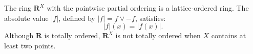 The ring $\mathbf{R}^X$ with the pointwise partial ordering is a lattice-ordered ring. The absolute value $|f|$, defined by $|f| = f \vee -f$, satisfies:
$$|f|(x) = |f(x)|.$$
Although $\mathbf{R}$ is totally ordered, $\mathbf{R}^X$ is not totally ordered when $X$ contains at least two points.
